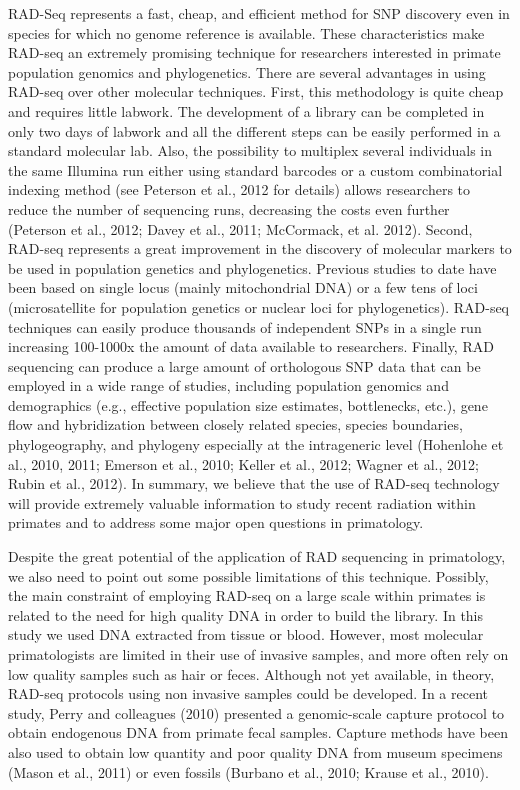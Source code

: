 \documentclass[12pt]{article}
\begin{document}
RAD-Seq represents a fast, cheap, and efficient method for SNP discovery even in species for which no genome reference is available. These characteristics make RAD-seq an extremely promising technique for researchers interested in primate population genomics and phylogenetics. There are several advantages in using RAD-seq over other molecular techniques. First, this methodology is quite cheap and requires little labwork. The development of a library can be completed in only two days of labwork and all the different steps can be easily performed in a standard molecular lab. Also, the possibility to multiplex several individuals in the same Illumina run either using standard barcodes or a custom combinatorial indexing method (see Peterson et al., 2012 for details) allows researchers to reduce the number of sequencing runs, decreasing the costs even further (Peterson et al., 2012; Davey et al., 2011; McCormack, et al. 2012). Second, RAD-seq represents a great improvement in the discovery of molecular markers to be used in population genetics and phylogenetics. Previous studies to date have been based on single locus (mainly mitochondrial DNA) or a few tens of loci (microsatellite for population genetics or nuclear loci for phylogenetics). RAD-seq techniques can easily produce thousands of independent SNPs in a single run increasing 100-1000x the amount of data available to researchers. Finally, RAD sequencing can produce a large amount of orthologous SNP data that can be employed in a wide range of studies, including population genomics and demographics (e.g., effective population size estimates, bottlenecks, etc.), gene flow and hybridization between closely related species, species boundaries, phylogeography, and phylogeny especially at the intrageneric level (Hohenlohe et al., 2010, 2011; Emerson et al., 2010; Keller et al., 2012; Wagner et al., 2012; Rubin et al., 2012). In summary, we believe that the use of RAD-seq technology will provide extremely valuable information to study recent radiation within primates and to address some major open questions in primatology.

Despite the great potential of the application of RAD sequencing in primatology, we also need to point out some possible limitations of this technique. Possibly, the main constraint of employing RAD-seq on a large scale within primates is related to the need for high quality DNA in order to build the library. In this study we used DNA extracted from tissue or blood. However, most molecular primatologists are limited in their use of invasive samples, and more often rely on low quality samples such as hair or feces. Although not yet available, in theory, RAD-seq protocols using non invasive samples could be developed. In a recent study, Perry and colleagues (2010) presented a genomic-scale capture protocol to obtain endogenous DNA from primate fecal samples. Capture methods have been also used to obtain low quantity and poor quality DNA from museum specimens (Mason et al., 2011) or even fossils (Burbano et al., 2010; Krause et al., 2010).
\end{document}
